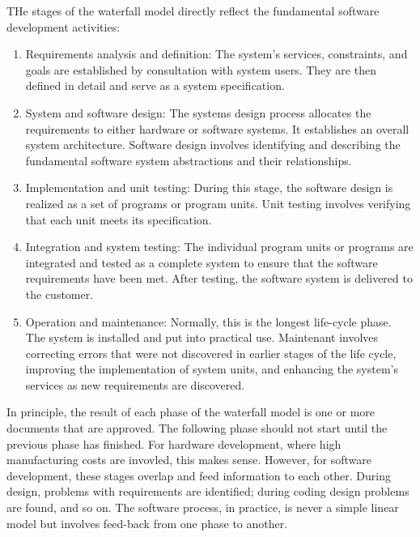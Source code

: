 THe stages of the waterfall model directly reflect the fundamental software development activities:
\begin{enumerate}
    \item Requirements analysis and definition: The system's services, constraints, and goals are established by consultation with system users. They are then defined in detail and serve as a system specification.
    \item System and software design: The systems design process allocates the requirements to either hardware or software systems. It establishes an overall system architecture. Software design involves identifying and describing the fundamental software system abstractions and their relationships.
    \item Implementation and unit testing: During this stage, the software design is realized as a set of programs or program units. Unit testing involves verifying that each unit meets its specification.
    \item Integration and system testing: The individual program units or programs are integrated and tested as a complete system to ensure that the software requirements have been met. After testing, the software system is delivered to the customer.
    \item Operation and maintenance: Normally, this is the longest life-cycle phase. The system is installed and put into practical use. Maintenant involves correcting errors that were not discovered in earlier stages of the life cycle, improving the implementation of system units, and enhancing the system's services as new requirements are discovered.
\end{enumerate}

In principle, the result of each phase of the waterfall model is one or more documents that are approved. The following phase should not start until the previous phase has finished. For hardware development, where high manufacturing costs are invovled, this makes sense. However, for software development, these stages overlap and feed information to each other. During design, problems with requirements are identified; during coding design problems are found, and so on. The software process, in practice, is never a simple linear model but involves feed-back from one phase to another.


